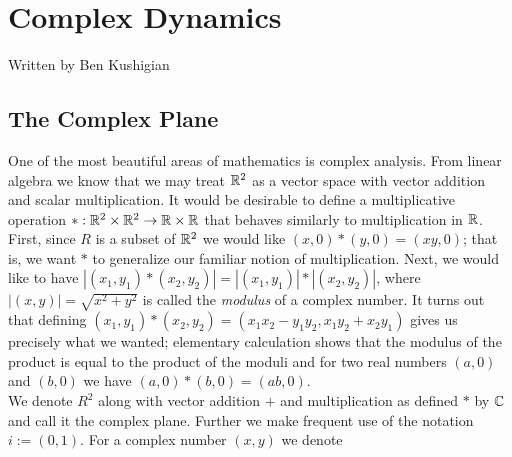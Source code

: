 \chapter{Complex Dynamics}
\label{chap:complex dynamics}
{Written by Ben Kushigian}
\section{The Complex Plane}
One of the most beautiful areas of mathematics is complex analysis. From 
linear algebra we know that we may treat \(\mathbb R^2\) as a vector space with
vector addition and scalar multiplication. It would be desirable to define
a multiplicative operation \(* : \mathbb R^2 \times \mathbb R^2 \rightarrow \mathbb R \times \mathbb R\)
that behaves similarly to multiplication in \(\mathbb R\). First, since \(R\) is a
subset of \(\mathbb R^2\) we would like \((x,0) * (y,0) = (xy,0)\); that is, we want
\(*\) to generalize our familiar notion of multiplication. Next, we would like
to have \(|(x_1, y_1) * (x_2, y_2)| = |(x_1, y_1)| * |(x_2, y_2)|\), where
\(|(x,y)| = \sqrt{x^2 + y^2}\) is called the {\em modulus} of a complex number.
It turns out that defining \((x_1,y_1)*(x_2,y_2) = (x_1x_2-y_1y_2, x_1y_2 + 
x_2y_1)\) gives us precisely what we wanted; elementary calculation shows that
the modulus of the product is equal to the product of the moduli and for
two real numbers \((a,0)\) and \((b,0)\) we have \((a,0)*(b,0) = (ab,0)\).\\

We denote \(R^2\) along with vector addition \(+\) and multiplication as defined
\(*\) by \(\mathbb C\) and call it the complex plane. Further we make frequent use
of the notation \(i:= (0,1)\). For a complex number \((x,y)\) we denote 

